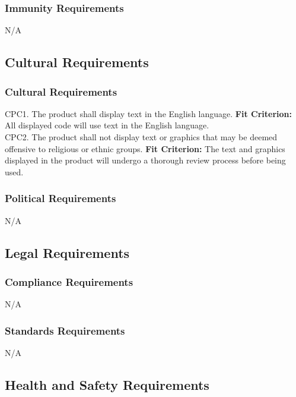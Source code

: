 \documentclass[12pt, titlepage]{article}
\begin{document}
\subsubsection{Immunity Requirements}

N/A

\subsection{Cultural Requirements}

\subsubsection{Cultural Requirements}

CPC1. The product shall display text in the English language.
  \textbf{Fit Criterion:} All displayed code will use text in the English language. \\

\noindent CPC2. The product shall not display text or graphics that may be deemed offensive to religious or ethnic groups.
	\textbf{Fit Criterion:} The text and graphics displayed in the product will undergo a thorough review process before being used. 

\subsubsection{Political Requirements}

N/A

\subsection{Legal Requirements}

\subsubsection{Compliance Requirements}

N/A

\subsubsection{Standards Requirements}

N/A

\subsection{Health and Safety Requirements}
\end{document}

